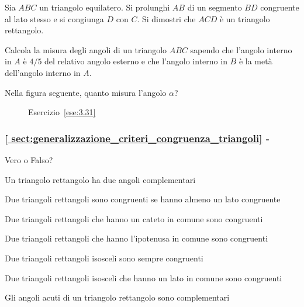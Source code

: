 \begin{multicols}{2}
\begin{esercizio}
\label{ese:3.48}
Sia $ABC$ un triangolo equilatero. Si prolunghi $AB$ di un segmento 
$BD$ congruente al lato stesso e si congiunga $D$ con $C$. Si 
dimostri che $ACD$ è un triangolo rettangolo.
\end{esercizio}

\begin{esercizio}
\label{ese:3.49}
Calcola la misura degli angoli di un triangolo $ABC$ sapendo che 
l'angolo interno in $A$ è $4/5$ del relativo angolo esterno e che 
l'angolo interno in $B$ è la metà dell'angolo interno in $A$.
\end{esercizio}

\begin{esercizio}
\label{ese:3.51}
Nella figura seguente, quanto misura l'angolo $\alpha$?  
\end{esercizio}

\begin{inaccessibleblock}
 \begin{figure}[htb]
\centering
\caption{Esercizio~\ref{ese:3.31}}\label{fig:ese3.51}
\end{figure}
\end{inaccessibleblock}

\begingroup
\hypersetup{linkcolor=black}
\subsubsection*{\ref{
sect:generalizzazione_criteri_congruenza_triangoli} - 
}
\endgroup

\begin{esercizio}
\label{ese:3.52}
Vero o Falso?
\begin{enumeratea}
\item Un triangolo rettangolo ha due angoli 
complementari\hfill\boxV\quad\boxF
\item Due triangoli rettangoli sono congruenti se hanno almeno un 
lato congruente\hfill\boxV\quad\boxF
\item Due triangoli rettangoli che hanno un cateto in comune sono 
congruenti\hfill\boxV\quad\boxF
\item Due triangoli rettangoli che hanno l'ipotenusa in comune sono 
congruenti\hfill\boxV\quad\boxF
\item Due triangoli rettangoli isosceli sono sempre 
congruenti\hfill\boxV\quad\boxF
\item Due triangoli rettangoli isosceli che hanno un lato in comune 
sono congruenti\hfill\boxV\quad\boxF
\item Gli angoli acuti di un triangolo rettangolo sono 
complementari\hfill\boxV\quad\boxF
\end{enumeratea}
\end{esercizio}


\end{multicols}
